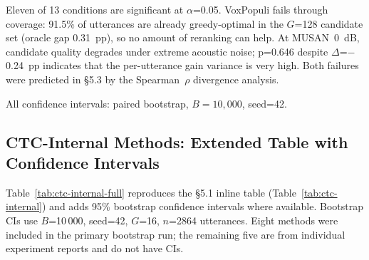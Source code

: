 Eleven of 13 conditions are significant at $\alpha$=0.05. VoxPopuli fails through coverage:
91.5\% of utterances are already greedy-optimal in the $G$=128 candidate set (oracle gap 0.31~pp),
so no amount of reranking can help. At MUSAN~0~dB, candidate quality degrades under extreme acoustic noise; p=0.646 despite
$\Delta$=$-$0.24~pp indicates that the per-utterance gain variance is very high. Both failures were
predicted in §5.3 by the Spearman~$\rho$ divergence analysis.

All confidence intervals: paired bootstrap, $B=10{,}000$, seed=42.



\subsection{CTC-Internal Methods: Extended Table with Confidence Intervals}

Table~\ref{tab:ctc-internal-full} reproduces the §5.1 inline table (Table~\ref{tab:ctc-internal})
and adds 95\% bootstrap confidence intervals where available. Bootstrap CIs use
$B$=10\,000, seed=42, $G$=16, $n$=2864 utterances. Eight methods were included in the primary bootstrap run; the remaining
five are from individual experiment reports and do not have CIs.

